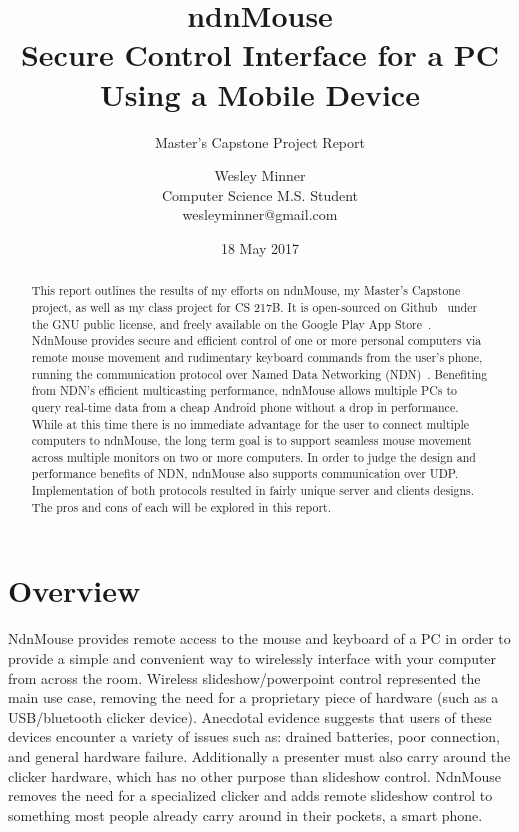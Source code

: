 \documentclass{sig-alternate}
\renewcommand\_{\textunderscore\allowbreak}  %
\begin{document}
	
\title{ndnMouse\\Secure Control Interface for a PC Using a Mobile Device}
\subtitle{Master's Capstone Project Report}
\author{
	Wesley Minner\\
	Computer Science M.S. Student\\
	wesleyminner@gmail.com
}

\date{18 May 2017}
\maketitle

\begin{abstract}
This report outlines the results of my efforts on ndnMouse, my Master's Capstone project, as well as my class project for CS 217B. It is open-sourced on Github~\cite{ndnMouseGH} under the GNU public license, and freely available on the Google Play App Store~\cite{ndnMouseGP}. NdnMouse provides secure and efficient control of one or more personal computers via remote mouse movement and rudimentary keyboard commands from the user's phone, running the communication protocol over Named Data Networking (NDN)~\cite{ndn}. Benefiting from NDN's efficient multicasting performance, ndnMouse allows multiple PCs to query real-time data from a cheap Android phone without a drop in performance. While at this time there is no immediate advantage for the user to connect multiple computers to ndnMouse, the long term goal is to support seamless mouse movement across multiple monitors on two or more computers. In order to judge the design and performance benefits of NDN, ndnMouse also supports communication over UDP. Implementation of both protocols resulted in fairly unique server and clients designs. The pros and cons of each will be explored in this report.
\end{abstract}


\section{Overview}
\label{sec:overview}
NdnMouse provides remote access to the mouse and keyboard of a PC in order to provide a simple and convenient way to wirelessly interface with your computer from across the room. Wireless slideshow/powerpoint control represented the main use case, removing the need for a proprietary piece of hardware (such as a USB/bluetooth clicker device). Anecdotal evidence suggests that users of these devices encounter a variety of issues such as: drained batteries, poor connection, and general hardware failure. Additionally a presenter must also carry around the clicker hardware, which has no other purpose than slideshow control. NdnMouse removes the need for a specialized clicker and adds remote slideshow control to something most people already carry around in their pockets, a smart phone. 
\end{document}
